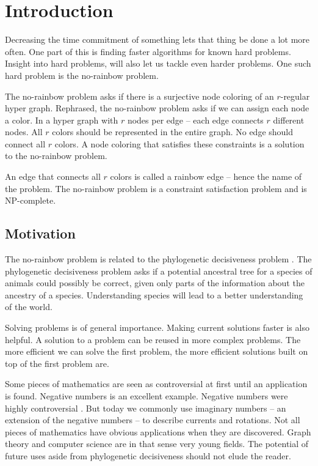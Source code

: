 \documentclass[msc,lith,english]{liuthesis}
\author{Edvard Thörnros}
\begin{document}
\chapter{Introduction}
\label{chaIntro}
Decreasing the time commitment of something lets that thing be done a lot more often.
One part of this is finding faster algorithms for known hard problems.
Insight into hard problems, will also let us tackle even harder problems.
One such hard problem is the no-rainbow problem.

The no-rainbow problem \cite{sourceNoRainbow} asks if there is a surjective node coloring of an $r$-regular hyper graph.
Rephrased, the no-rainbow problem asks if we can assign each node a color.
In a hyper graph with $r$ nodes per edge -- each edge connects $r$ different nodes.
All $r$ colors should be represented in the entire graph.
No edge should connect all $r$ colors.
A node coloring that satisfies these constraints is a solution to the no-rainbow problem.

An edge that connects all $r$ colors is called a rainbow edge -- hence the name of the problem.
The no-rainbow problem is a constraint satisfaction problem and is NP-complete.

\section{Motivation}
The no-rainbow problem is related to the phylogenetic decisiveness problem \cite{sourceNoRainbow, sourcePhylogeneticDecisiveness}. The
phylogenetic decisiveness problem asks if a potential ancestral tree for a
species of animals could possibly be correct, given only parts of the
information about the ancestry of a species.
Understanding species will lead to a better understanding of the world.  

Solving problems is of general importance. Making current solutions faster is also helpful.
A solution to a problem can be reused in more complex problems. The more
efficient we can solve the first problem, the more efficient solutions built on
top of the first problem are. 

Some pieces of mathematics are seen as controversial at first until an application is found.
Negative numbers is an excellent example. Negative numbers were highly
controversial \cite{sourceNeg}. But today we commonly use imaginary numbers -- an extension of the negative numbers -- to
describe currents and rotations. Not all pieces of mathematics have obvious
applications when they are discovered. Graph theory and computer science are in
that sense very young fields.
The potential of future uses aside from phylogenetic decisiveness should not elude the reader.
\end{document}
